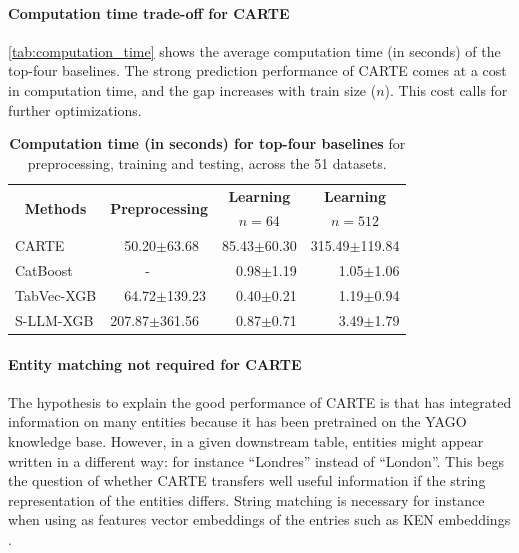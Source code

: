 \documentclass{article}
\theoremstyle{plain}
\theoremstyle{definition}
\theoremstyle{remark}
\begin{document}
\paragraph{Computation time trade-off for CARTE} 

\autoref{tab:computation_time} shows the average computation time (in seconds) of the top-four baselines. The strong prediction performance of CARTE comes at a cost in computation time, and the gap increases with train size ($n$). This cost calls for further optimizations.

\begin{table}[t]
\begin{center}
\setlength{\tabcolsep}{3.1pt}
\small
\caption{\textbf{Computation time (in seconds) for top-four baselines} for preprocessing, training and testing, across the 51 datasets.%
\label{tab:computation_time}
}
\begin{tabular}{llll}
\toprule
\multicolumn{1}{c}{\multirow{2}{*}{\textbf{Methods}}} & \multicolumn{1}{c}{\multirow{2}{*}{\textbf{Preprocessing}}} & \multicolumn{1}{c}{\textbf{Learning}} & \multicolumn{1}{c}{\textbf{Learning}} \\
 & & \multicolumn{1}{c}{$n=64$} & \multicolumn{1}{c}{$n=512$} \\
\midrule
\rowcolor{gray!25}
CARTE         & ~~50.20$\pm$63.68   & 85.43$\pm$60.30 & 315.49$\pm$119.84 \\
CatBoost      & ~~~~~-                 & ~~0.98$\pm$1.19   & ~~~~1.05$\pm$1.06 \\
\rowcolor{gray!25}
TabVec-XGB    & ~~64.72$\pm$139.23  & ~~0.40$\pm$0.21   & ~~~~1.19$\pm$0.94 \\
S-LLM-XGB     & 207.87$\pm$361.56 & ~~0.87$\pm$0.71   & ~~~~3.49$\pm$1.79 \\
\bottomrule
\end{tabular}
\end{center}
\end{table}

\paragraph{Entity matching not required for CARTE}

The hypothesis to explain the good performance of CARTE is that has integrated information on many entities because it has been pretrained on the YAGO knowledge base. However, in a given downstream table, entities might appear written in a different way: for instance ``Londres'' instead of ``London''. This begs the question of whether CARTE transfers well useful information if the string representation of the entities differs. String matching is necessary for instance when using as features vector embeddings of the entries such as KEN embeddings \citep{cvetkov2023relational}.
\end{document}

